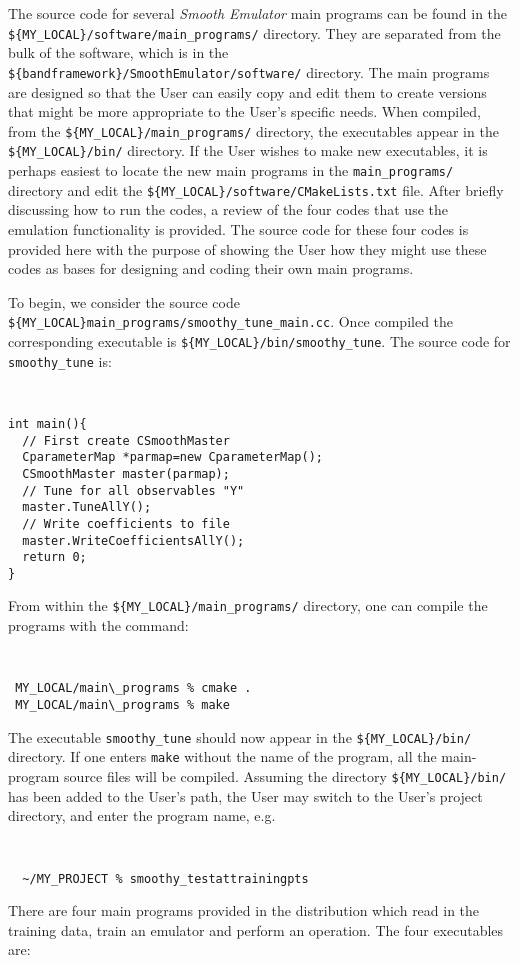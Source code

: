 \documentclass[UserManual.tex]{subfiles}
\begin{document}
The source code for several {\it Smooth Emulator} main programs can be found in the \\{\tt \$\{MY\_LOCAL\}/software/main\_programs/} directory. They are separated from the bulk of the software, which is in the {\tt \$\{bandframework\}/SmoothEmulator/software/} directory. The main programs are designed so that the User can easily copy and edit them to create versions that might be more appropriate to the User's specific needs. When compiled, from the {\tt \$\{MY\_LOCAL\}/main\_programs/} directory, the executables appear in the {\tt \$\{MY\_LOCAL\}/bin/} directory. If the User wishes to make new executables, it is perhaps easiest to locate the new main programs in the {\tt main\_programs/} directory and edit the {\tt \$\{MY\_LOCAL\}/software/CMakeLists.txt} file. After briefly discussing how to run the codes, a review of the four codes that use the emulation functionality is provided. The source code for these four codes is provided here with the purpose of showing the User how they might use these codes as bases for designing and coding their own main programs.

To begin, we consider the source code {\tt \$\{MY\_LOCAL\}main\_programs/smoothy\_tune\_main.cc}. Once compiled the corresponding executable is {\tt \$\{MY\_LOCAL\}/bin/smoothy\_tune}. The source code for {\tt smoothy\_tune} is:
{\tt
\begin{verbatim}
int main(){
  // First create CSmoothMaster
  CparameterMap *parmap=new CparameterMap();
  CSmoothMaster master(parmap);  
  // Tune for all observables "Y"
  master.TuneAllY();
  // Write coefficients to file
  master.WriteCoefficientsAllY();
  return 0;
}
\end{verbatim}
}
From within the {\tt \$\{MY\_LOCAL\}/main\_programs/} directory, one can compile the programs with the command:
{\tt
\begin{verbatim}
 MY_LOCAL/main\_programs % cmake .
 MY_LOCAL/main\_programs % make
\end{verbatim}
}
The executable {\tt smoothy\_tune} should now appear in the {\tt \$\{MY\_LOCAL\}/bin/} directory. If one enters {\tt make} without the name of the program, all the main-program source files will be compiled. Assuming the directory {\tt \$\{MY\_LOCAL\}/bin/} has been added to the User's path, the User may switch to the User's project directory, and enter the program name, e.g.
{\tt
\begin{verbatim}
  ~/MY_PROJECT % smoothy_testattrainingpts
\end{verbatim}
}
There are four main programs provided in the distribution which read in the training data, train an emulator and perform an operation. The four executables are:
\end{document}
